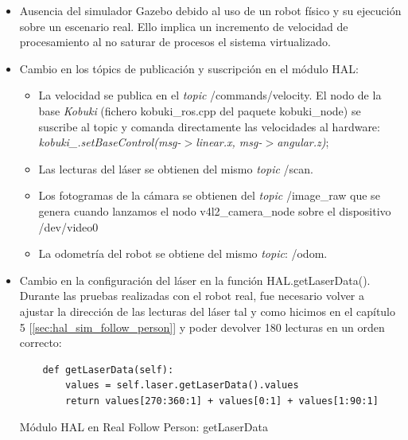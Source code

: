 \begin{itemize}
	\item Ausencia del simulador Gazebo debido al uso de un robot físico y su ejecución sobre un escenario real. Ello implica un incremento de velocidad de procesamiento al no saturar de procesos el sistema virtualizado.
	\item Cambio en los tópics de publicación y suscripción en el módulo HAL:
	\begin{itemize}
		\item La velocidad se publica en el \textit{topic} /commands/velocity. El nodo de la base \textit{Kobuki} (fichero kobuki\_ros.cpp del paquete kobuki\_node) se suscribe al topic y comanda directamente las velocidades al hardware: \textit{kobuki\_.setBaseControl(msg-$>$linear.x, msg-$>$angular.z)};
		\item Las lecturas del láser se obtienen del mismo \textit{topic} /scan.
		\item Los fotogramas de la cámara se obtienen del \textit{topic} /image\_raw que se genera cuando lanzamos el nodo v4l2\_camera\_node sobre el dispositivo /dev/video0
		\item La odometría del robot se obtiene del mismo \textit{topic}: /odom.
	\end{itemize}
	\item Cambio en la configuración del láser en la función HAL.getLaserData(). Durante las pruebas realizadas con el robot real, fue necesario volver a ajustar la dirección de las lecturas del láser tal y como hicimos en el capítulo 5 [\ref{sec:hal_sim_follow_person}] y poder devolver 180 lecturas en un orden correcto:
	\begin{code}[H]
	\begin{lstlisting}
	def getLaserData(self):
		values = self.laser.getLaserData().values
		return values[270:360:1] + values[0:1] + values[1:90:1]
	\end{lstlisting}
	\caption{Módulo HAL en Real Follow Person: getLaserData}
	\label{cod:real_follow_person_hal_laser}
	\end{code}
\end{itemize}

